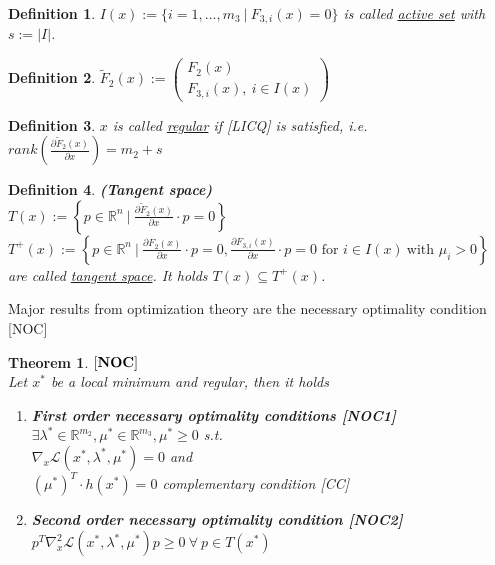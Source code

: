 \documentclass{scrartcl}[12pt, halfparskip]
\numberwithin{equation}{section}
\numberwithin{figure}{section}
\numberwithin{table}{section}
\newtheorem{Definition}{Definition}
\newtheorem{Theorem}{Theorem}
\begin{document}
\begin{Definition}
	$I(x) := \{ i=1,...,m_3 \ | \ F_{3,i}(x) = 0 \}$ is called \underline{active set} with $s := \vert I \vert$.
\end{Definition}

\begin{Definition}
	$\tilde{F}_2(x) := 
	\begin{pmatrix}
		F_2(x) \\
		F_{3,i}(x), \ i \in I(x) 
	\end{pmatrix}$
\end{Definition}

\begin{Definition}
	$x$ is called \underline{regular} if [LICQ] is satisfied, i.e. $rank \left( \frac{\partial \tilde F_2(x)}{\partial x} \right) = m_2 + s$
\end{Definition}

\begin{Definition}
	\textbf{(Tangent space)} \\
	$T(x) := \left\{ p \in \mathbb{R}^n \ | \ \frac{\partial \tilde F_2(x)}{\partial x} \cdot p = 0 \right\}$ \\
	$T^+(x) := \left\{ p \in \mathbb{R}^n \ | \ \frac{\partial F_2(x)}{\partial x} \cdot p = 0, \frac{\partial F_{3,i}(x)}{\partial x} \cdot p = 0 \text{ for } i \in I(x) \ \text{with } \mu_i > 0 \right\}$ \\
	are called \underline{tangent space}. It holds $T(x) \subseteq T^+(x)$.
\end{Definition}

Major results from optimization theory are the necessary optimality condition [NOC]

\begin{Theorem}
	$[\text{\textbf{NOC}}]$ \\
	Let $x^*$ be a local minimum and regular, then it holds
	\begin{enumerate}
		\item \textbf{First order necessary optimality conditions [NOC1]} \\
		$\exists \lambda^* \in \mathbb{R}^{m_2}, \mu^* \in \mathbb{R}^{m_3}, \mu^* \ge 0$ s.t. \\
		$\nabla_x \mathcal{L}(x^*, \lambda^*, \mu^*) = 0$ and \\
		$(\mu^*)^T \cdot h(x^*) = 0$ complementary condition [CC]
		\item \textbf{Second order necessary optimality condition [NOC2]} \\
		$p^T \nabla_x^2 \mathcal{L}(x^*, \lambda^*, \mu^*) p \ge 0 \ \forall \ p \in T(x^*)$
	\end{enumerate}
\end{Theorem}
\end{document}
